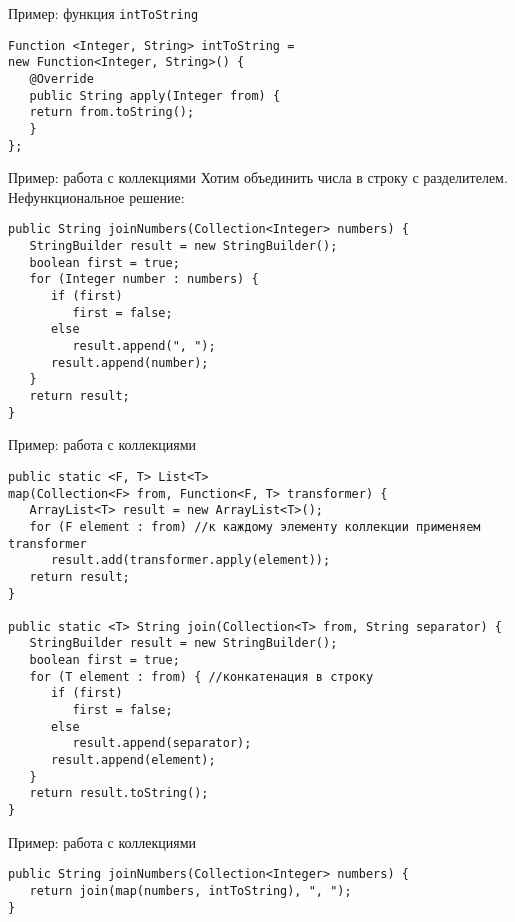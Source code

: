 \documentclass[aspectratio=169]{beamer}
\begin{document}
\begin{frame}[fragile]{Пример: функция \texttt{intToString}}
	\begin{verbatim}
Function <Integer, String> intToString = 
new Function<Integer, String>() {
   @Override
   public String apply(Integer from) {
   return from.toString();
   }
};

	\end{verbatim}
\end{frame}

\begin{frame}[fragile]{Пример: работа с коллекциями}
	Хотим объединить числа в строку с разделителем. Нефункциональное решение:
	\begin{verbatim}
public String joinNumbers(Collection<Integer> numbers) {
   StringBuilder result = new StringBuilder();
   boolean first = true;
   for (Integer number : numbers) {
      if (first)
         first = false;
      else
         result.append(", ");
      result.append(number);
   }
   return result;
}
	\end{verbatim}

\end{frame}

\begin{frame}[fragile]{Пример: работа с коллекциями}
	\begin{verbatim}
public static <F, T> List<T>
map(Collection<F> from, Function<F, T> transformer) {
   ArrayList<T> result = new ArrayList<T>();
   for (F element : from) //к каждому элементу коллекции применяем transformer
      result.add(transformer.apply(element));
   return result;
}

public static <T> String join(Collection<T> from, String separator) {
   StringBuilder result = new StringBuilder();
   boolean first = true;
   for (T element : from) { //конкатенация в строку
      if (first)
         first = false;
      else
         result.append(separator);
      result.append(element);
   }
   return result.toString();
}
	\end{verbatim}
\end{frame}

\begin{frame}[fragile]{Пример: работа с коллекциями}
	\begin{verbatim}
public String joinNumbers(Collection<Integer> numbers) {
   return join(map(numbers, intToString), ", ");
}
	\end{verbatim}
\end{frame}
\end{document}
